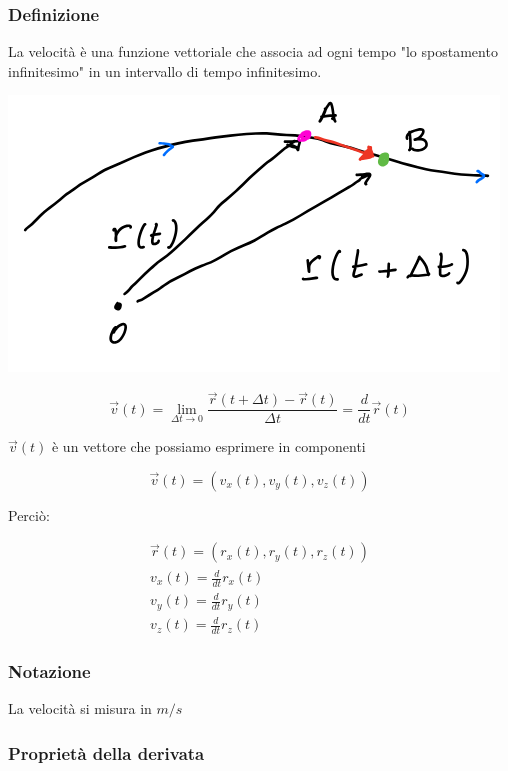 \documentclass{subfiles}
\begin{document}
\subsubsection{Definizione}

La velocità è una funzione vettoriale che associa ad ogni tempo "lo spostamento infinitesimo" in un intervallo di tempo infinitesimo.

\includegraphics[width=\columnwidth]{rappresentazione-velocita-grafica}

$$
\vec{v}(t) = \lim_{\Delta t \to 0} \frac{\vec{r}(t + \Delta t) - \vec{r}(t)}{\Delta t} = \frac{d}{dt} \vec{r}(t)
$$

\noindent
$\vec{v}(t)$ è un vettore che possiamo esprimere in componenti

$$
\vec{v}(t) = (v_x(t), v_y(t), v_z(t))
$$

\noindent
Perciò:

$$
\begin{matrix}
\vec{r}(t) = (r_x(t), r_y(t), r_z(t)) \\
v_x(t) = \frac{d}{dt} r_x(t) \\
v_y(t) = \frac{d}{dt} r_y(t) \\
v_z(t) = \frac{d}{dt} r_z(t)
\end{matrix}
$$

\subsubsection{Notazione}

La velocità si misura in $m/s$

\subsubsection{Proprietà della derivata}
\end{document}
